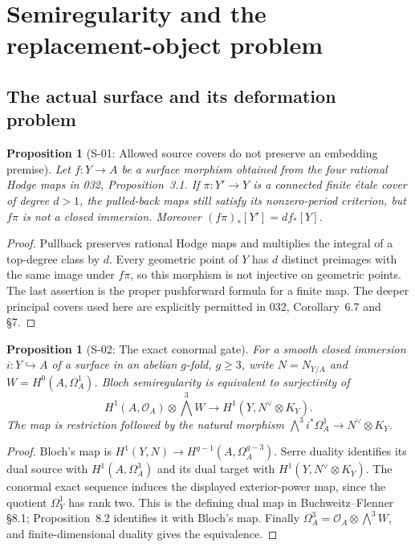 \documentclass[11pt,a4paper]{article}
\newtheorem{proposition}[theorem]{Proposition}
\theoremstyle{definition}
\begin{document}
\section{Semiregularity and the replacement-object problem}


\subsection{The actual surface and its deformation problem}

\begin{proposition}[S-01: Allowed source covers do not preserve an embedding premise]
\label{prop:semireg-cover-domain}
Let $f:Y\to A$ be a surface morphism obtained from the four rational
Hodge maps in 032, Proposition~3.1. If $\pi:Y'\to Y$ is a connected finite
\'etale cover of degree $d>1$, the pulled-back maps still satisfy its
nonzero-period criterion, but $f\pi$ is not a closed immersion.
Moreover $(f\pi)_*[Y']=d f_*[Y]$.
\end{proposition}
\begin{proof}
Pullback preserves rational Hodge maps and multiplies the integral of
a top-degree class by $d$. Every geometric point of $Y$ has $d$ distinct
preimages with the same image under $f\pi$, so this morphism is not
injective on geometric points. The last assertion is the proper
pushforward formula for a finite map. The deeper principal covers
used here are explicitly permitted in 032, Corollary~6.7 and \S7.
\end{proof}

\begin{proposition}[S-02: The exact conormal gate]
\label{prop:semireg-dual-gate}
For a smooth closed immersion $i:Y\hookrightarrow A$ of a surface in
an abelian $g$-fold, $g\geq3$, write $N=N_{Y/A}$ and
$W=H^0(A,\Omega_A^1)$. Bloch semiregularity is equivalent to
surjectivity of
\[
 H^1(A,\mathcal O_A)\otimes\bigwedge^3W
 \longrightarrow H^1(Y,N^\vee\otimes K_Y).
\]
The map is restriction followed by the natural morphism
$\bigwedge^3 i^*\Omega_A^1\to N^\vee\otimes K_Y$.
\end{proposition}
\begin{proof}
Bloch's map is
$H^1(Y,N)\to H^{g-1}(A,\Omega_A^{g-3})$.
Serre duality identifies its dual source with $H^1(A,\Omega_A^3)$
and its dual target with $H^1(Y,N^\vee\otimes K_Y)$.
The conormal exact sequence induces the displayed exterior-power
map, since the quotient $\Omega_Y^1$ has rank two.
This is the defining dual map in Buchweitz--Flenner \S8.1;
Proposition~8.2 identifies it with Bloch's map.
Finally $\Omega_A^3=\mathcal O_A\otimes\bigwedge^3W$,
and finite-dimensional duality gives the equivalence.
\end{proof}
\end{document}
